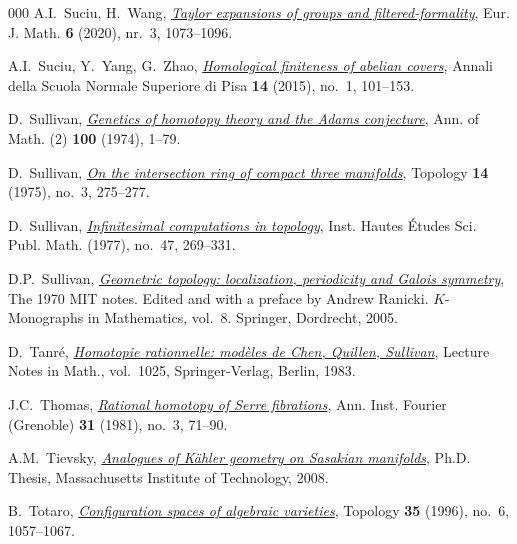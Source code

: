 \documentclass{article}
\numberwithin{equation}{section}
\theoremstyle{definition}
\begin{document}
\begin{thebibliography}{000}
 A.I.~Suciu, H.~Wang, 
\href{https://doi.org/10.1007/s40879-019-00389-6}%
{\em Taylor expansions of groups and filtered-formality}, 
Eur. J. Math.  \textbf{6} (2020), nr.~3, 1073--1096.

 A.I.~Suciu, Y.~Yang, G.~Zhao, 
\href{https://dx.doi.org/10.2422/2036-2145.201205_008}%
{\em  Homological finiteness of abelian covers}, 
Annali della Scuola Normale Superiore di Pisa \textbf{14} (2015), 
no.~1, 101--153.

 D.~Sullivan, 
\href{https://dx.doi.org/10.2307/1970841}%
{\em Genetics of homotopy theory and the Adams conjecture},  
Ann. of Math. (2) \textbf{100} (1974), 1--79. 

 D.~Sullivan, 
\href{https://dx.doi.org/10.1016/0040-9383(75)90009-9}%
{\em On the intersection ring of compact three manifolds}, 
Topology \textbf{14} (1975), no.~3, 275--277. 

 D.~Sullivan, 
\href{https://dx.doi.org/10.1007/BF02684341}%
{\em Infinitesimal computations in topology}, Inst. Hautes \'Etudes 
Sci. Publ. Math. (1977), no.~47, 269--331. 

 D.P.~Sullivan, 
\href{https://link-springer-com.ezproxy.neu.edu/book/9789048103508}%
{\em Geometric topology: localization, periodicity and Galois symmetry}, 
The 1970 MIT notes. Edited and with a preface by Andrew Ranicki. 
$K$-Monographs in Mathematics, vol.~8. Springer, Dordrecht, 2005. 

 D.~Tanr\'{e}, 
\href{https://doi.org/10.1007/BFb0071482}%
{\em Homotopie rationnelle: modèles de Chen, Quillen, Sullivan}, 
Lecture Notes in Math., vol.~1025, Springer-Verlag, Berlin, 1983.

 J.C.~Thomas, 
\href{https://dx.doi.org/10.5802/aif.838}
{\em Rational homotopy of Serre fibrations},
Ann. Inst. Fourier (Grenoble) \textbf{31} (1981), no.~3, 71--90.

 A.M.~Tievsky, 
\href{https://dspace.mit.edu/handle/1721.1/45349}%
{\em Analogues of K\"{a}hler geometry on Sasakian manifolds}, 
Ph.D. Thesis, Massachusetts Institute of Technology, 2008. 

 B.~Totaro,
\href{https://dx.doi.org/10.1016/0040-9383(95)00058-5}%
{\em Configuration spaces of algebraic varieties},
Topology \textbf{35} (1996), no.~6, 1057--1067.


\end{thebibliography}
\end{document}
